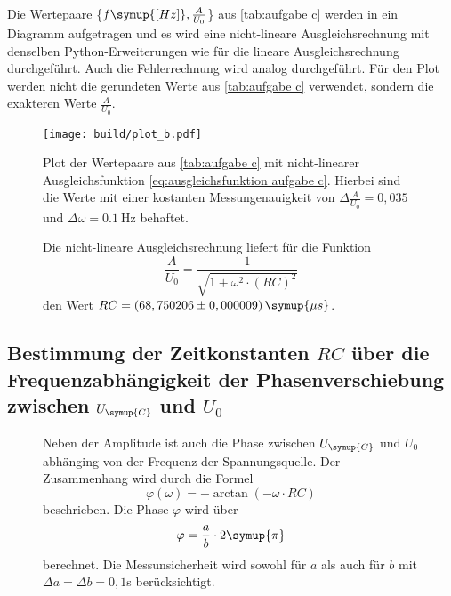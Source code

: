 Die Wertepaare \{$f \symup{[Hz]}, \frac{A}{U_{0}}$\} aus \autoref{tab:aufgabe c} werden in ein Diagramm aufgetragen
und es wird eine nicht-lineare Ausgleichsrechnung mit denselben Python-Erweiterungen wie für die lineare Ausgleichsrechnung
durchgeführt. Auch die Fehlerrechnung wird analog durchgeführt. Für den Plot werden nicht die
gerundeten Werte aus \autoref{tab:aufgabe c} verwendet, sondern die exakteren Werte $\frac{A}{U_{0}}$.

\begin{figure}
  \centering
  \texttt{[image: build/plot\_b.pdf]}
  \caption{Plot der Wertepaare aus \autoref{tab:aufgabe c} mit nicht-linearer Ausgleichsfunktion \autoref{eq:ausgleichsfunktion aufgabe c}.%
  Hierbei sind die Werte mit einer kostanten Messungenauigkeit von $\Delta \frac{A}{U_0} = 0,035$ und $\Delta \omega = \qty{0,1}{\hertz}$ behaftet.}
  \label{fig:plot_b}
\end{figure}

\begin{figure}[H]
Die nicht-lineare Ausgleichsrechnung liefert für die Funktion 
  \begin{equation}
    \frac{A}{U_{0}} = \frac{1}{\sqrt{1+{\omega}^{2}\cdot (RC)^2}} 
    \label{eq:ausgleichsfunktion aufgabe c}
  \end{equation}
den Wert $RC = (68,750206\pm0,000009)\,\symup{\mu s}$.
\end{figure}



\subsection{Bestimmung der Zeitkonstanten $RC$ über die Frequenzabhängigkeit der Phasenverschiebung%
 zwischen $U_{\symup{C}}$ und $U_{0}$}
 \begin{figure}[H]
  Neben der Amplitude ist auch die Phase zwischen $U_{\symup{C}}$ und $U_{0}$ abhänging von der Frequenz der Spannungsquelle.
  Der Zusammenhang wird durch die Formel
  \begin{equation}
    \varphi(\omega) = -\arctan(-\omega \cdot RC)
    \label{eq:Formel für Phasenverschiebung}
  \end{equation}
  beschrieben. 
 Die Phase $\varphi$ wird über
 \begin{equation}
   \varphi = \frac{a}{b}\cdot 2\symup{\pi}
 \end{equation}
 berechnet. Die Messunsicherheit wird sowohl für $a$ als auch für $b$ mit $\Delta a = \Delta b = 0,1$s berücksichtigt.
 \end{figure}
 
